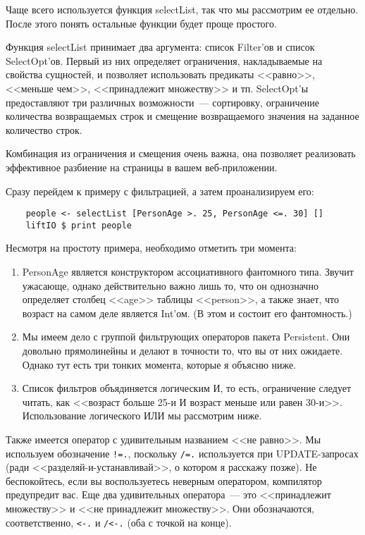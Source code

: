 Чаще всего используется функция selectList, так что мы рассмотрим ее отдельно. После этого понять остальные функции будет проще простого.

Функция selectList принимает два аргумента: список Filter'ов и список SelectOpt'ов. Первый из них определяет ограничения, накладываемые на свойства сущностей, и позволяет использовать предикаты <<равно>>, <<меньше чем>>, <<принадлежит множеству>> и тп. SelectOpt'ы предоставляют три различных возможности~--- сортировку, ограничение количества возвращаемых строк и смещение возвращаемого значения на заданное количество строк.

\begin{remark}
Комбинация из ограничения и смещения очень важна, она позволяет реализовать эффективное разбиение на страницы в вашем веб-приложении.
\end{remark}

Сразу перейдем к примеру с фильтрацией, а затем проанализируем его:

\begin{lstlisting}
    people <- selectList [PersonAge >. 25, PersonAge <=. 30] []
    liftIO $ print people
\end{lstlisting}%

Несмотря на простоту примера, необходимо отметить три момента:

\begin{enumerate}
\item PersonAge является конструктором ассоциативного фантомного типа. Звучит ужасающе, однако действительно важно лишь то, что он однозначно определяет столбец <<age>> таблицы <<person>>, а также знает, что возраст на самом деле является Int'ом. (В этом и состоит его фантомность.)
\item Мы имеем дело с группой фильтрующих операторов пакета Persistent. Они довольно прямолинейны и делают в точности то, что вы от них ожидаете. Однако тут есть три тонких момента, которые я объясню ниже.
\item Список фильтров объядиняется логическим И, то есть, ограничение следует читать, как <<возраст больше 25-и И возраст меньше или равен 30-и>>. Использование логического ИЛИ мы рассмотрим ниже.
\end{enumerate}

Также имеется оператор с удивительным названием <<не равно>>. Мы используем обозначение \lstinline'!=.', поскольку \lstinline'/=.' используется при UPDATE-запросах (ради <<разделяй-и-устанавливай>>, о котором я расскажу позже). Не беспокойтесь, если вы воспользуетесь неверным оператором, компилятор предупредит вас. Еще два удивительных оператора~--- это <<принадлежит множеству>> и <<не принадлежит множеству>>. Они обозначаются, соответственно, \lstinline'<-.' и \lstinline'/<-.' (оба с точкой на конце).

